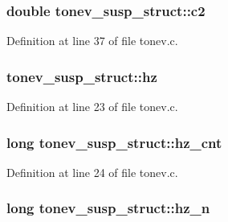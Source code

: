 \subsubsection[{\texorpdfstring{c2}{c2}}]{\setlength{\rightskip}{0pt plus 5cm}double tonev\+\_\+susp\+\_\+struct\+::c2}\hypertarget{structtonev__susp__struct_afd70a673ea56aaf7b73faa6eb2fff510}{}\label{structtonev__susp__struct_afd70a673ea56aaf7b73faa6eb2fff510}


Definition at line 37 of file tonev.\+c.

\subsubsection[{\texorpdfstring{hz}{hz}}]{ tonev\+\_\+susp\+\_\+struct\+::hz}\hypertarget{structtonev__susp__struct_a0a828e5b180a1ffbfe5b0c3e73dbba0e}{}\label{structtonev__susp__struct_a0a828e5b180a1ffbfe5b0c3e73dbba0e}


Definition at line 23 of file tonev.\+c.

\subsubsection[{\texorpdfstring{hz\+\_\+cnt}{hz_cnt}}]{\setlength{\rightskip}{0pt plus 5cm}long tonev\+\_\+susp\+\_\+struct\+::hz\+\_\+cnt}\hypertarget{structtonev__susp__struct_a7120f181d2cbeb876d5faba29011ad89}{}\label{structtonev__susp__struct_a7120f181d2cbeb876d5faba29011ad89}


Definition at line 24 of file tonev.\+c.

\subsubsection[{\texorpdfstring{hz\+\_\+n}{hz_n}}]{\setlength{\rightskip}{0pt plus 5cm}long tonev\+\_\+susp\+\_\+struct\+::hz\+\_\+n}\hypertarget{structtonev__susp__struct_a49e892432be0a51d93f26c3b489cf1f4}{}\label{structtonev__susp__struct_a49e892432be0a51d93f26c3b489cf1f4}


